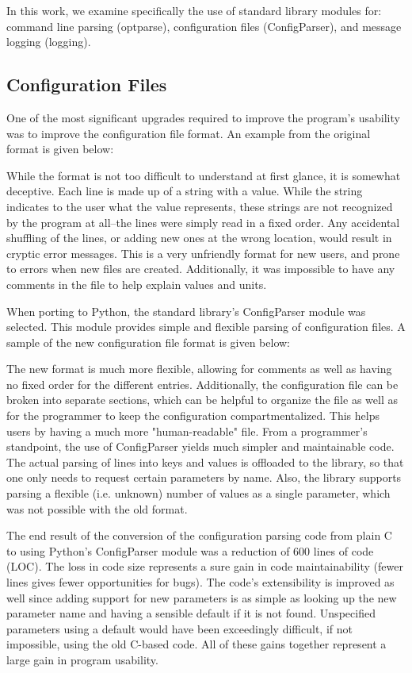 \documentclass[twocolumn]{article}
\begin{document}
In this work, we examine specifically the use of standard library modules for:
command line parsing (optparse), configuration files (ConfigParser), and message logging (logging).

\subsection{Configuration Files}
One of the most significant upgrades required to improve the program's usability
was to improve the configuration file format. An example from the original
format is given below:

  

While the format is not too difficult to understand at first glance, it is
somewhat deceptive. Each line is made up of a string with a value. While the
string indicates to the user what the value represents, these strings are not
recognized by the program at all--the lines were simply read in a fixed order.
Any accidental shuffling of the lines, or adding new ones at the wrong location,
would result in cryptic error messages. This is a very unfriendly format for new
users, and prone to errors when new files are created. Additionally, it
was impossible to have any comments in the file to help explain values and
units.

When porting to Python, the standard library's ConfigParser module was selected.
\cite{configparser} This module provides simple and flexible parsing of
configuration files. A sample of the new configuration file format is given
below:



The new format is much more flexible, allowing for comments as well as having
no fixed order for the different entries. Additionally, the configuration file
can be broken into separate sections, which can be helpful to organize the file
as well as for the programmer to keep the configuration compartmentalized. This
helps users by having a much more "human-readable" file. From a programmer's
standpoint, the use of ConfigParser yields much simpler and maintainable code.
The actual parsing of lines into keys and values is offloaded to the library, so
that one only needs to request certain parameters by name. Also, the library
supports parsing a flexible (i.e. unknown) number of values as a single
parameter, which was not possible with the old format.

The end result of the conversion of the configuration parsing code from plain C
to using Python's ConfigParser module was a reduction of 600 lines of code
(LOC). The loss in code size represents a sure gain in code maintainability
(fewer lines gives fewer opportunities for bugs). The code's extensibility is
improved as well since adding support for new parameters is as simple as
looking up the new parameter name and having a sensible default if it is not
found. Unspecified parameters using a default would have been exceedingly
difficult, if not impossible, using the old C-based code. All of these gains
together represent a large gain in program usability.
\end{document}
